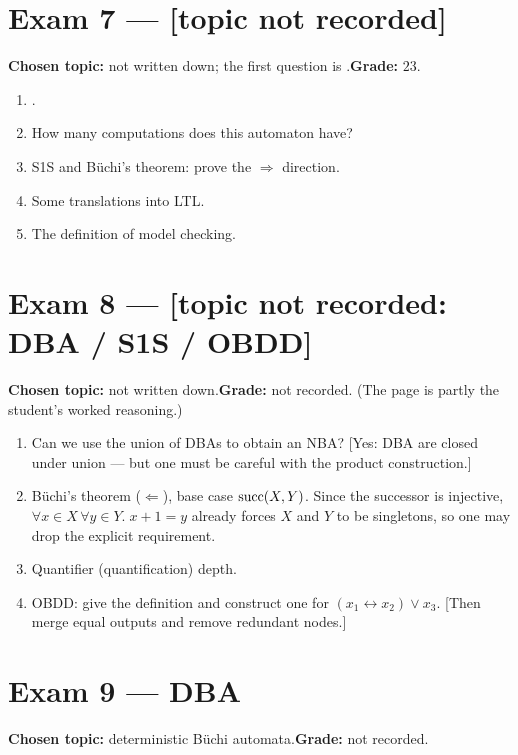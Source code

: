 \documentclass[oneside]{academica}
\begin{document}
\section{Exam 7 --- [topic not recorded]}
\textbf{Chosen topic:} not written down; the first question is
.\quad\textbf{Grade:} $23$.

\begin{enumerate}
  \item {}.
  \item How many computations does this automaton have?
  \item S1S and Büchi's theorem: prove the $\Rightarrow$ direction.
  \item Some translations into LTL.
  \item The definition of model checking.
\end{enumerate}

\section{Exam 8 --- [topic not recorded: DBA / S1S / OBDD]}
\textbf{Chosen topic:} not written down.\quad\textbf{Grade:} not
recorded. (The page is partly the student's worked reasoning.)

\begin{enumerate}
  \item Can we use the union of DBAs to obtain an NBA? [Yes: DBA are
    closed under union --- but one must be careful with the product
    construction.]
  \item Büchi's theorem ($\Leftarrow$), base case $\text{succ}(X,Y)$. Since the
    successor is injective, $\forall x\in X\,\forall y\in Y.\;x{+}1=y$
    already forces $X$ and $Y$ to be singletons, so one may drop the
    explicit  requirement.
  \item Quantifier (quantification) depth.
  \item OBDD: give the definition and construct one for $(x_1
    \leftrightarrow x_2)\vee x_3$. [Then merge equal outputs and remove
    redundant nodes.]
\end{enumerate}

\section{Exam 9 --- DBA}
\textbf{Chosen topic:} deterministic Büchi automata.\quad\textbf{Grade:}
not recorded.
\end{document}

